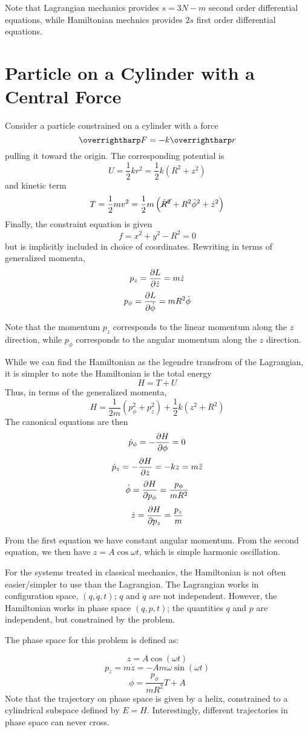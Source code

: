Note that Lagrangian mechanics provides \(s=3N-m\) second order differential equations, while Hamiltonian mechnics provides \(2s\) first order differential equations.

\section{Particle on a Cylinder with a Central Force}
Consider a particle constrained on a cylinder with a force
\[\vv{F}=-k\vv{r}\]
pulling it toward the origin. The corresponding potential is
\[U=\frac{1}{2}kr^2=\frac{1}{2}k\left(R^2+z^2\right)\]
and kinetic term
\[T=\frac{1}{2}mv^2=\frac{1}{2}m\left(\cancel{\dot R^2} + R^2\dot\phi^2+\dot z^2\right)\]
Finally, the constraint equation is given
\[f = x^2+y^2-R^2=0\]
but is implicitly included in choice of coordinates. Rewriting in terms of generalized momenta,
\[p_z=\frac{\partial L}{\partial \dot z}=m\dot z\]
\[p_\phi = \frac{\partial L}{\partial \dot\phi}=mR^2\dot\phi\]

Note that the momentum \(p_z\) corresponds to the linear momentum along the \(z\) direction, while \(p_\phi\) corresponds to the angular momentum along the \(z\) direction.

While we can find the Hamiltonian as the legendre transfrom of the Lagrangian, it is simpler to note the Hamiltonian is the total energy
\begin{equation}
	H = T+U
\end{equation}
Thus, in terms of the generalized momenta,
\[H=\frac{1}{2m}\left(p_\phi^2+p_z^2\right)+\frac{1}{2}k(z^2+R^2)\]
The canonical equations are then
\[\dot p_\phi = -\frac{\partial H}{\partial \phi}=0\]
\[\dot p_z = -\frac{\partial H}{\partial z}= -k z=m\ddot z\]
\[\dot \phi = \frac{\partial H}{\partial p_\phi}=\frac{p_\phi}{mR^2}\]
\[\dot z=\frac{\partial H}{\partial p_z} = \frac{p_z}{m}\]

From the first equation we have constant angular momentum. From the second equation, we then have \(z=A\cos\omega t\), which is simple harmonic oscillation.

For the systems treated in classical mechanics, the Hamiltonian is not often easier/simpler to use than the Lagrangian. The Lagrangian works in configuration space, \((q,\dot q , t)\); \(q\) and \(\dot q\) are not independent.
However, the Hamiltonian works in phase space \((q, p, t)\); the quantities \(q\) and \(p\) are independent, but constrained by the problem.

The phase space for this problem is defined as:

\[z = A\cos(\omega t)\]
\[p_z = m\dot z = -Am\omega\sin(\omega t)\]
\[\phi = \frac{p_\phi}{mR^2}T+A\]
Note that the trajectory on phase space is given by a helix, constrained to a cylindrical subspace defined by \(E=H\).
Interestingly, different trajectories in phase space can never cross.

